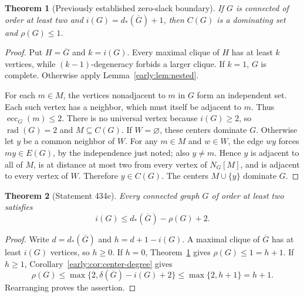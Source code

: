\documentclass[11pt,a4paper]{article}
\newtheorem{theorem}{Theorem}[section]
\theoremstyle{definition}\newtheorem{definition}[theorem]{Definition}
\theoremstyle{remark}\newtheorem{remark}[theorem]{Remark}
\newcommand{\rad}{\operatorname{rad}}
\begin{document}
\begin{theorem}[Previously established zero-slack boundary]
\label{early:thm:zero-slack}
If $G$ is connected of order at least two and
$i(G)=d_*(\overline G)+1$, then $C(G)$ is a dominating set and
$\rho(G)\leq1$.
\end{theorem}
\begin{proof}
Put $H=\overline G$ and $k=i(G)$.  Every maximal clique of $H$ has at
least $k$ vertices, while $(k-1)$-degeneracy forbids a larger clique.
If $k=1$, $G$ is complete.  Otherwise apply
Lemma~\ref{early:lem:nested}.

For each $m\in M$, the vertices nonadjacent to $m$ in $G$ form an
independent set.  Each such vertex has a neighbor, which must itself be
adjacent to $m$.  Thus $\operatorname{ecc}_G(m)\leq2$.  There is no
universal vertex because $i(G)\geq2$, so $\rad(G)=2$ and
$M\subseteq C(G)$.  If $W=\varnothing$, these centers dominate $G$.
Otherwise let $y$ be a common neighbor of $W$.  For any $m\in M$ and
$w\in W$, the edge $wy$ forces $my\in E(G)$, by the independence just
noted; also $y\ne m$.  Hence $y$ is adjacent to all of $M$, is at
distance at most two from every vertex of $N_G[M]$, and is adjacent to
every vertex of $W$.  Therefore $y\in C(G)$.  The centers $M\cup\{y\}$
dominate $G$.
\end{proof}

\begin{theorem}[Statement 434e]
\label{early:thm:434e}
Every connected graph $G$ of order at least two satisfies
\[
 i(G)\leq d_*(\overline G)-\rho(G)+2.
\]
\end{theorem}
\begin{proof}
Write $d=d_*(\overline G)$ and $h=d+1-i(G)$.  A maximal clique of
$\overline G$ has at least $i(G)$ vertices, so $h\geq0$.  If $h=0$,
Theorem~\ref{early:thm:zero-slack} gives $\rho(G)\leq1=h+1$.
If $h\geq1$, Corollary~\ref{early:cor:center-degree} gives
\[
 \rho(G)\leq\max\{2,\delta(\overline G)-i(G)+2\}
 \leq\max\{2,h+1\}=h+1.
\]
Rearranging proves the assertion.
\end{proof}
\end{document}
